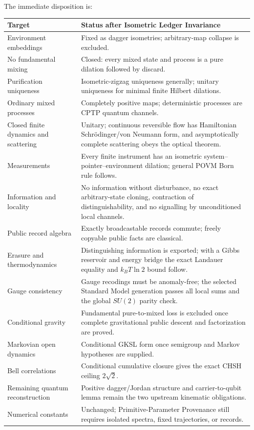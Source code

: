 \begin{remark}
The immediate disposition is:
\begin{center}
\small
\begin{tabularx}{\textwidth}{l Y}
\toprule
Target & Status after Isometric Ledger Invariance \\
\midrule
Environment embeddings
& Fixed as dagger isometries; arbitrary-map collapse is excluded. \\
No fundamental mixing
& Closed: every mixed state and process is a pure dilation followed by discard. \\
Purification uniqueness
& Isometric-zigzag uniqueness generally; unitary uniqueness for minimal finite Hilbert dilations. \\
Ordinary mixed processes
& Completely positive maps; deterministic processes are CPTP quantum channels. \\
Closed finite dynamics and scattering
& Unitary; continuous reversible flow has Hamiltonian Schr\"odinger/von Neumann form, and asymptotically complete scattering obeys the optical theorem. \\
Measurements
& Every finite instrument has an isometric system--pointer--environment dilation; general POVM Born rule follows. \\
Information and locality
& No information without disturbance, no exact arbitrary-state cloning, contraction of distinguishability, and no signalling by unconditioned local channels. \\
Public record algebra
& Exactly broadcastable records commute; freely copyable public facts are classical. \\
Erasure and thermodynamics
& Distinguishing information is exported; with a Gibbs reservoir and energy bridge the exact Landauer equality and \(k_BT\ln2\) bound follow. \\
Gauge consistency
& Gauge recodings must be anomaly-free; the selected Standard Model generation passes all local sums and the global \(SU(2)\) parity check. \\
Conditional gravity
& Fundamental pure-to-mixed loss is excluded once complete gravitational public descent and factorization are proved. \\
Markovian open dynamics
& Conditional GKSL form once semigroup and Markov hypotheses are supplied. \\
Bell correlations
& Conditional cumulative closure gives the exact CHSH ceiling \(2\sqrt2\). \\
Remaining quantum reconstruction
& Positive dagger/Jordan structure and carrier-to-qubit lemma remain the two upstream kinematic obligations. \\
Numerical constants
& Unchanged; Primitive-Parameter Provenance still requires isolated spectra, fixed trajectories, or records. \\
\bottomrule
\end{tabularx}
\end{center}
\end{remark}

